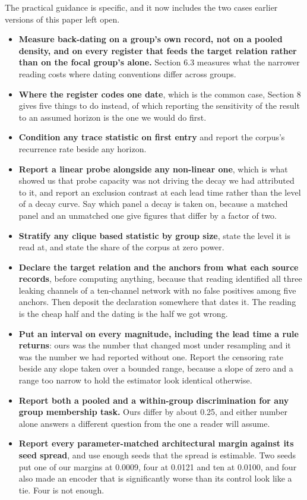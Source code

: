 \documentclass[twoside,11pt]{article}
\providecommand{\tightlist}{%
  \setlength{\itemsep}{0pt}\setlength{\parskip}{0pt}}
\begin{document}
The practical guidance is specific, and it now includes the two cases earlier versions of this paper left open.

\begin{itemize}
\tightlist
\item
  \textbf{Measure back-dating on a group's own record, not on a pooled density, and on every register that feeds the target relation rather than on the focal group's alone.} Section 6.3 measures what the narrower reading costs where dating conventions differ across groups.
\item
  \textbf{Where the register codes one date}, which is the common case, Section 8 gives five things to do instead, of which reporting the sensitivity of the result to an assumed horizon is the one we would do first.
\item
  \textbf{Condition any trace statistic on first entry} and report the corpus's recurrence rate beside any horizon.
\item
  \textbf{Report a linear probe alongside any non-linear one}, which is what showed us that probe capacity was not driving the decay we had attributed to it, and report an exclusion contrast at each lead time rather than the level of a decay curve. Say which panel a decay is taken on, because a matched panel and an unmatched one give figures that differ by a factor of two.
\item
  \textbf{Stratify any clique based statistic by group size}, state the level it is read at, and state the share of the corpus at zero power.
\item
  \textbf{Declare the target relation and the anchors from what each source records}, before computing anything, because that reading identified all three leaking channels of a ten-channel network with no false positives among five anchors. Then deposit the declaration somewhere that dates it. The reading is the cheap half and the dating is the half we got wrong.
\item
  \textbf{Put an interval on every magnitude, including the lead time a rule returns}: ours was the number that changed most under resampling and it was the number we had reported without one. Report the censoring rate beside any slope taken over a bounded range, because a slope of zero and a range too narrow to hold the estimator look identical otherwise.
\item
  \textbf{Report both a pooled and a within-group discrimination for any group membership task.} Ours differ by about 0.25, and either number alone answers a different question from the one a reader will assume.
\item
  \textbf{Report every parameter-matched architectural margin against its seed spread}, and use enough seeds that the spread is estimable. Two seeds put one of our margins at 0.0009, four at 0.0121 and ten at 0.0100, and four also made an encoder that is significantly worse than its control look like a tie. Four is not enough.
\end{itemize}
\end{document}
